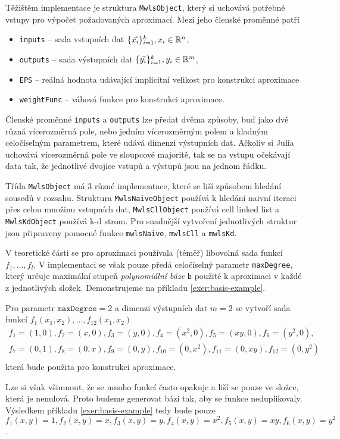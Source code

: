 Těžištěm implementace je struktura \texttt{MwlsObject}, který si uchovává potřebné vstupy pro výpočet požadovaných aproximací. Mezi jeho členské proměnné patří
\begin{itemize}
  \item \texttt{inputs} -- sada vstupních dat $\{\vec{x_i}\}_{i=1}^k, x_i \in \mathbb{R}^n$,
  \item \texttt{outputs} -- sada výstupních dat $\{\vec{y_i}\}_{i=1}^k, y_i \in \mathbb{R}^m$,
  \item \texttt{EPS} -- reálná hodnota udávající implicitní velikost  pro konstrukci aproximace
  \item \texttt{weightFunc} -- váhová funkce pro konstrukci aproximace.
\end{itemize}
Členské proměnné \texttt{inputs} a \texttt{outputs} lze předat dvěma způsoby, buď jako dvě různá vícerozměrná pole, nebo jedním vícerozměrným polem a kladným celočíselným parametrem, které udává dimenzi výstupních dat. Ačkoliv si Julia uchovává vícerozměrná pole ve sloupcové majoritě, tak se na vstupu očekávají data tak, že jednotlivé dvojice vstupů a výstupů jsou na jednom řádku.

Třída \texttt{MwlsObject} má 3 různé implementace, které se liší způsobem hledání sousedů v rozsahu. Struktura \texttt{MwlsNaiveObject} používá k hledání naivní iteraci přes celou množinu vstupních dat, \texttt{MwlsCllObject} používá cell linked list a \texttt{MwlsKdObject} používá k-d strom. Pro snadnější vytvoření jednotlivých struktur jsou připraveny pomocné funkce \texttt{mwlsNaive}, \texttt{mwlsCll} a \texttt{mwlsKd}.

V teoretické části se pro aproximaci používala (téměř) libovolná sada funkcí $f_1, \ldots, f_l$. V implementaci se však pouze předá celočíselný parametr \texttt{maxDegree}, který určuje maximální stupeň \textit{polynomiální báze} \texttt{b} použité k aproximaci v každé z jednotlivých složek. Demonstrujeme na příkladu \ref{exer:basis-example}.
\begin{priklad}
  \label{exer:basis-example}
  Pro parametr $\texttt{maxDegree} = 2$ a dimenzi výstupních dat $m = 2$ se vytvoří sada funkcí $f_1(x_1, x_2), \ldots, f_{12}(x_1, x_2)$
  \begin{multline}
    f_1 = (1, 0), f_2 = (x, 0), f_3 = (y, 0), f_4 = (x^2, 0), f_5 = (xy, 0), f_6 = (y^2, 0),\\
    f_7 = (0, 1), f_8 = (0, x), f_9 = (0, y), f_{10} = (0, x^2), f_{11} = (0, xy), f_{12} = (0, y^2)\\
  \end{multline}
  která bude použita pro konstrukci aproximace.
\end{priklad}
Lze si však všimnout, že se mnoho funkcí často opakuje a liší se pouze ve složce, která je nenulová. Proto budeme generovat bázi tak, aby se funkce neduplikovaly. Výsledkem příkladu \ref{exer:basis-example} tedy bude pouze $f_1(x, y) = 1, f_2(x, y) = x, f_3(x,y) = y, f_4(x,y)=x^2,f_5(x, y)=xy,f_6(x, y)=y^2$.

